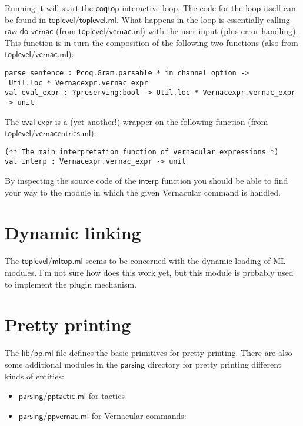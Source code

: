 \documentclass[a4paper,oneside]{book}
\newcommand{\m}[1]{\ensuremath{\mathsf{#1}}}
\begin{document}
Running it will start the \m{coqtop} interactive loop. The code for
the loop itself can be found in \m{toplevel/toplevel.ml}. What happens
in the loop is essentially calling \m{raw\_do\_vernac} (from
\m{toplevel/vernac.ml}) with the user input (plus error
handling). This function is in turn the composition of the following
two functions (also from \m{toplevel/vernac.ml}):

\begin{lstlisting}
parse_sentence : Pcoq.Gram.parsable * in_channel option ->
 Util.loc * Vernacexpr.vernac_expr
val eval_expr : ?preserving:bool -> Util.loc * Vernacexpr.vernac_expr -> unit
\end{lstlisting}

\noindent
The \m{eval\_expr} is a (yet another!) wrapper on the following
function (from \m{toplevel/vernacentries.ml}):

\begin{lstlisting}
(** The main interpretation function of vernacular expressions *)
val interp : Vernacexpr.vernac_expr -> unit
\end{lstlisting}

\noindent
By inspecting the source code of the \m{interp} function you should be
able to find your way to the module in which the given Vernacular
command is handled.

\newpage

\section{Dynamic linking}

The \m{toplevel/mltop.ml} seems to be concerned with the dynamic
loading of ML modules. I'm not sure how does this work yet, but this
module is probably used to implement the plugin mechanism.

\section{Pretty printing}

The \m{lib/pp.ml} file defines the basic primitives for pretty
printing. There are also some additional modules in the \m{parsing}
directory for pretty printing different kinds of entities:

\begin{itemize}
\item \m{parsing/pptactic.ml} for tactics
\item \m{parsing/ppvernac.ml} for Vernacular commands:
\end{itemize}
\end{document}
